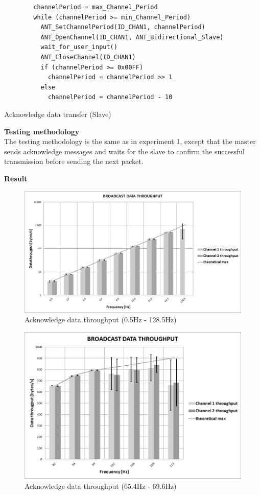 \begin{description}
	\begin{code}[H]
		\begin{verbatim}
		channelPeriod = max_Channel_Period
		while (channelPeriod >= min_Channel_Period) 
		  ANT_SetChannelPeriod(ID_CHAN1, channelPeriod)
		  ANT_OpenChannel(ID_CHAN1, ANT_Bidirectional_Slave)
		  wait_for_user_input()
		  ANT_CloseChannel(ID_CHAN1)
		  if (channelPeriod >= 0x00FF)
		    channelPeriod = channelPeriod >> 1
		  else
		    channelPeriod = channelPeriod - 10
		\end{verbatim}
		\caption{Acknowledge data transfer (Slave)}\label{lst:sExp3}
	\end{code}
	\item{\textbf{Testing methodology}} \hfill \\ The testing methodology is the same as in experiment 1, except that the master sends acknowledge messages and waits for the slave to confirm the successful transmission before sending the next packet. 
	\newpage
	\item{\textbf{Result}} \hfill \\
	\begin{figure}[H]
		\centering
		\includegraphics[scale=0.5]{content/images/exp3_norm.png}
		\caption{Acknowledge data throughput (0.5Hz - 128.5Hz)}\label{fig:exp4norm}
	\end{figure}
	\begin{figure}[H]
		\centering
		\includegraphics[scale=0.5]{content/images/exp3_detail.png}
		\caption{Acknowledge data throughput (65.4Hz - 69.6Hz)}\label{fig:exp4between}
	\end{figure}
	

\end{description}
